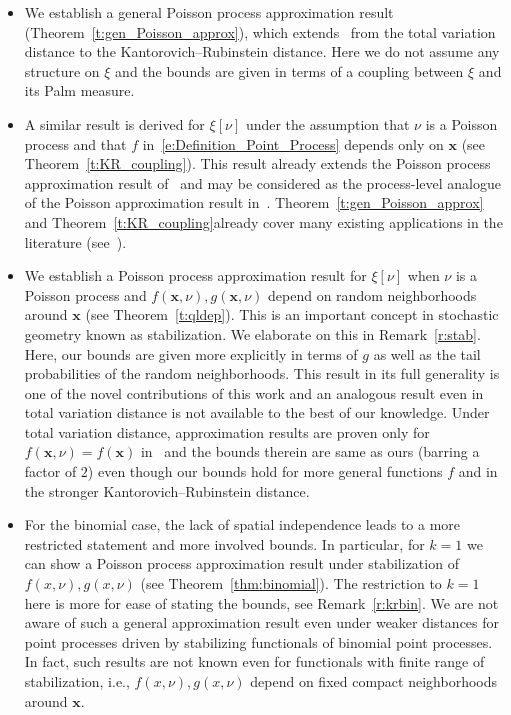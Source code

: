 \documentclass[10pt]{amsart}
\theoremstyle{definition}\newtheorem{defi}[theo]{Definition}\newtheorem{rema}[theo]{Remark}\newtheorem{exam}[theo]{Example}\newtheorem{exem}[theo]{Example}\newtheorem{nota}[theo]{Notation}
\newcommand{\bx}{\mathbf{x}}
\begin{document}
\begin{itemize}
\item We establish a general Poisson process approximation result (Theorem~\ref{t:gen_Poisson_approx}), which extends~\cite[Theorem~2.6]{Barbour1992} from the total variation distance to the Kantorovich--Rubinstein distance. Here we do not assume any structure on $\xi$ and the bounds are given in terms of a coupling between $\xi$ and its Palm measure.

\item A similar result is derived for $\xi[\nu]$ under the assumption that $\nu$ is a Poisson process and that $f$ in~\eqref{e:Definition_Point_Process} depends only on $\bx$ (see Theorem~\ref{t:KR_coupling}). This result already extends the Poisson process approximation result of~\cite[Theorem~3.1]{decreusefond_functional_2016} and may be considered as the process-level analogue of the Poisson approximation result in~\cite[Theorem~3.1]{penrose_inhomogeneous_2018}. Theorem~\ref{t:gen_Poisson_approx} and Theorem~\ref{t:KR_coupling}\linebreak already cover many existing applications in the literature (see~\cite{decreusefond_functional_2016,Otto2020}).

\item We establish a Poisson process approximation result for $\xi[\nu]$ when $\nu$ is a Poisson process and $f(\bx,\nu), g(\bx,\nu)$ depend on random neighborhoods around $\bx$ (see Theorem~\ref{t:qldep}). This is an important concept in stochastic geometry known as stabilization. We elaborate on this in Remark~\ref{r:stab}. Here, our bounds are given more explicitly in terms of $g$ as well as the tail probabilities of the random neighborhoods. This result in its full generality is one of the novel contributions of this work and an analogous result even in total variation distance is not available to the best of our knowledge. Under total variation distance, approximation results are proven only for $f(\bx,\nu) = f(\bx)$ in~\cite[Theorem~3.3]{Otto2020} and the bounds therein are same as ours (barring a factor of $2$) even though our bounds hold for more general functions $f$ and in the stronger Kantorovich--Rubinstein distance.

\item For the binomial case, the lack of spatial independence leads to a more restricted statement and more involved bounds. In particular, for $k = 1$ we can show a Poisson process approximation result under {stabilization} of $f(x,\nu), g(x,\nu)$ (see Theorem~\ref{thm:binomial}). The restriction to $k=1$ here is more for ease of stating the bounds, see Remark~\ref{r:krbin}. We are not aware of such a general approximation result even under weaker distances for point processes driven by stabilizing functionals of binomial point processes. In fact, such results are not known even for functionals with finite range of stabilization, i.e., $f(x,\nu), g(x,\nu)$ depend on fixed compact neighborhoods around $\bx$.
\end{itemize}
\end{document}
